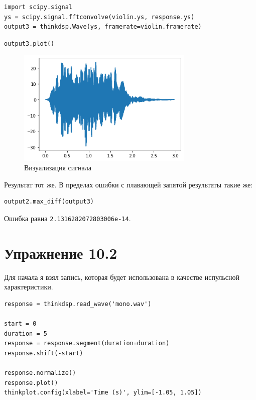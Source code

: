 \documentclass[a4paper,12pt]{report}
\begin{document}
\begin{lstlisting}[caption=Изменение сигнала]
import scipy.signal
ys = scipy.signal.fftconvolve(violin.ys, response.ys)
output3 = thinkdsp.Wave(ys, framerate=violin.framerate)
\end{lstlisting}

\begin{lstlisting}[caption=Визуализация сигнала]
output3.plot()
\end{lstlisting}

\begin{figure}[H]
        \centering
        \includegraphics[width=0.75\textwidth]{8.png}
        \caption{Визуализация сигнала}
        \label{8}
\end{figure}

Результат тот же. В пределах ошибки с плавающей запятой результаты такие же:

\begin{lstlisting}[caption=Сравнение результатов]
output2.max_diff(output3)
\end{lstlisting}

Ошибка равна \texttt{2.1316282072803006e-14}.

\chapter{Упражнение 10.2}

Для начала я взял запись, которая будет использована в качестве испульсной характеристики.

\begin{lstlisting}[caption=Загрузка звука]
response = thinkdsp.read_wave('mono.wav')

start = 0
duration = 5
response = response.segment(duration=duration)
response.shift(-start)

response.normalize()
response.plot()
thinkplot.config(xlabel='Time (s)', ylim=[-1.05, 1.05])
\end{lstlisting}
\end{document}
